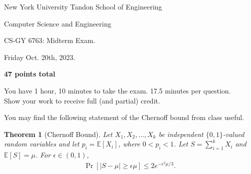 \documentclass[10pt]{article}
\newcommand{\E}{\mathbb{E}}
\newtheorem{theorem}{Theorem}
\begin{document}
	
\begin{center}
	\normalsize
	New York University Tandon School of Engineering
	
	Computer Science and Engineering
	\medskip
	
	\large
	CS-GY 6763: Midterm Exam. 
	
	Friday  Oct. 20th, 2023.
	
	\textbf{47 points total}
	
	\vspace{1em}
	You have 1 hour, 10 minutes to take the exam. 17.5 minutes per question.\\
	Show your work to receive full (and partial) credit.

	\vspace{1em}
	You may find the following statement of the Chernoff bound from class useful.
\end{center} 
\begin{theorem}[Chernoff Bound]
	Let $X_1,X_2,\ldots,X_k$ be independent $\{0,1\}$-valued random variables and let
	$p_i = \E[X_i]$, where $0<p_i<1$.
	Let $S = \sum_{i=1}^{k} X_i$ and $\E[S] = \mu$. For $\epsilon \in (0,1)$,
	\begin{align*}
			\Pr[|S - \mu| \geq \epsilon \mu] \leq 2e^{-\epsilon^2 \mu/3}.
	\end{align*}
\end{theorem} 
\end{document}
